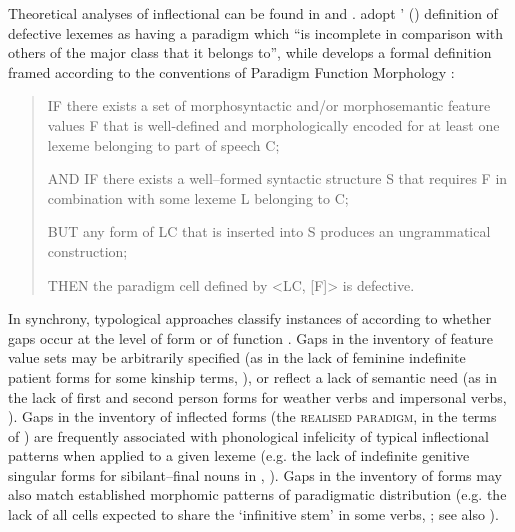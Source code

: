 \documentclass[output=paper,colorlinks,citecolor=brown]{langscibook}
\begin{document}
Theoretical analyses of inflectional  can be found in \citet{baermancorbett2010} and \citet{sims2015}. \citet[1]{baermancorbett2010} adopt \citeauthor{matthews1997}' (\citeyear[89]{matthews1997}) definition of defective lexemes as having a paradigm which ``is incomplete in comparison with others of the major class that it belongs to'', while \citet[26]{sims2015} develops a formal definition framed according to the conventions of Paradigm Function Morphology \citep{stump2001, stump2016}:

\begin{quote}
	IF there exists a set of morphosyntactic and/or morphosemantic feature values F that is well-defined and morphologically encoded for at least one lexeme belonging to part of speech C;
	
	AND IF there exists a well--formed syntactic structure S that requires F in combination with some lexeme L belonging to C;
	
	BUT any form of LC that is inserted into S produces an ungrammatical construction;
	
	THEN the paradigm cell defined by \textless LC, [F]\textgreater{} is defective. \citep[26]{sims2015}
\end{quote}

In synchrony, typological approaches classify instances of  according to whether gaps occur at the level of form or of function \citep{baermancorbett2010, sims2015}. Gaps in the inventory of feature value sets may be arbitrarily specified (as in the lack of feminine indefinite patient forms for some  kinship terms, \citealt[78--79]{sims2015}), or reflect a lack of semantic need (as in the lack of first and second person forms for weather verbs and impersonal verbs, \citealt{baermancorbett2010}). Gaps in the inventory of inflected forms (the \textsc{realised paradigm}, in the terms of \citealt{stump2016}) are frequently associated with phonological infelicity of typical inflectional patterns when applied to a given lexeme (e.g. the lack of indefinite genitive singular forms for sibilant--final nouns in , \citealt[60]{sims2015}). Gaps in the inventory of forms may also match established morphomic patterns of paradigmatic distribution (e.g. the lack of all cells expected to share the `infinitive stem' in some  verbs, \citealt{baermancorbett2010}; see also \citealt{maidenoneill2010}).
\end{document}
